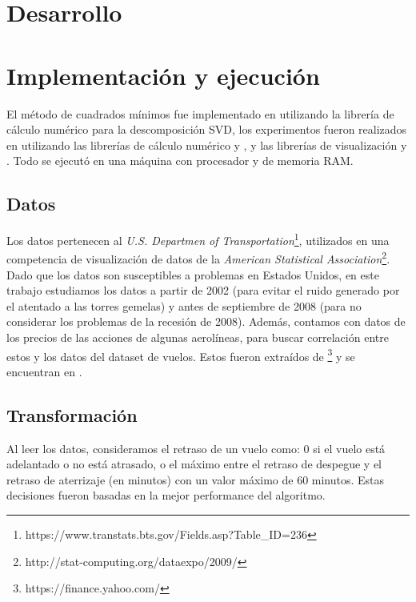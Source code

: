 \section{Desarrollo}\label{sec:desarrollo}

\section{Implementaci\'on y ejecuci\'on}\label{sec:ejecucion}
El m\'etodo de cuadrados m\'inimos fue implementado en  utilizando
la librer\'ia de c\'alculo num\'erico  para la descomposici\'on SVD,
los experimentos fueron realizados en  utilizando las librer\'ias
de c\'alculo num\'erico  y , y
las librer\'ias de visualizaci\'on  y .
Todo se ejecut\'o en una m\'aquina con procesador 
y  de memoria RAM.

\subsection{Datos}\label{subsec:datos}
Los datos pertenecen al \textit{U.S. Departmen of
Transportation}\footnote{https://www.transtats.bts.gov/Fields.asp?Table\_ID=236},
utilizados en una competencia de visualizaci\'on
de datos de la \textit{American Statistical Association}\footnote{
http://stat-computing.org/dataexpo/2009/}.
Dado que los datos son susceptibles a problemas en Estados Unidos, en este trabajo
estudiamos los datos a partir de 2002 (para evitar el ruido generado por el atentado a las torres
gemelas) y antes de septiembre de 2008 (para no considerar los problemas de la recesi\'on de 2008).
Adem\'as, contamos con datos de los precios de las acciones de algunas aerol\'ineas, para
buscar correlaci\'on entre estos y los datos del dataset de vuelos. Estos fueron extra\'idos de
\footnote{https://finance.yahoo.com/} y se encuentran en
.

\subsection{Transformaci\'on}\label{subsec:transformacion}
Al leer los datos, consideramos el retraso de un vuelo como: 0 si el vuelo est\'a adelantado o no est\'a
atrasado, o el m\'aximo entre el retraso de despegue y el retraso de aterrizaje (en minutos) con un
valor m\'aximo de 60 minutos. Estas decisiones fueron basadas en la mejor performance del algoritmo.

